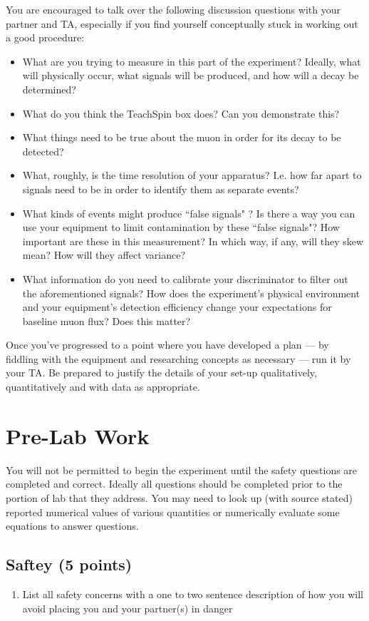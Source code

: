 \documentclass[aps,prb,groupedaddress,notitlepage,nofootinbib]{revtex4-1} %
\begin{document}
You are encouraged to talk over the following discussion questions with your partner and TA, especially if you find yourself conceptually stuck in working out a good procedure:


{
\begin{itemize}
\item What are you trying to measure in this part of the experiment? Ideally, what will physically occur, what signals will be produced, and how will a decay be determined?
\item What do you think the TeachSpin box does? Can you demonstrate this?
\item What things need to be true about the muon in order for its decay to be detected?
\item What, roughly, is the time resolution of your apparatus? I.e. how far apart to signals need to be in order to identify them as separate events? 
\item What kinds of events might produce ``false signals" ? Is there a way you can use your equipment to limit contamination by these ``false signals"? How important are these in this measurement? In which way, if any, will they skew mean? How will they affect variance?
\item What information do you need to calibrate your discriminator to filter out the aforementioned signals? How does the experiment's physical environment and your equipment's detection efficiency change your expectations for baseline muon flux? Does this matter?
\end{itemize}
}
Once you've progressed to a point where you have developed a plan --- by fiddling with the equipment and researching concepts as necessary --- run it by your TA. Be prepared to justify the details of your set-up qualitatively, quantitatively  and with data as appropriate.
\newpage
\section{Pre-Lab Work}
You will not be permitted to begin the experiment until the safety questions are completed and correct. Ideally all questions should be completed prior to the portion of lab that they address. You may need to look up (with source stated) reported numerical values of various quantities or numerically evaluate some equations to answer questions.

\subsection{Saftey (5 points)}
\begin{enumerate}
\item List all safety concerns with a one to two sentence description of how you will avoid placing you and your partner(s) in danger
\end{enumerate}
\end{document}
